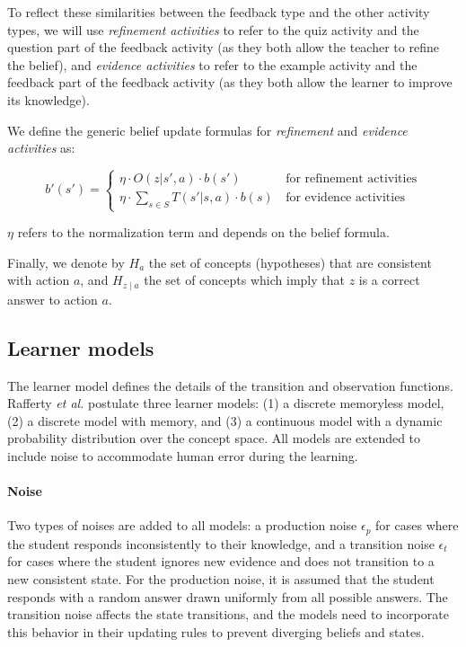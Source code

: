 \vspace{3mm}
To reflect these similarities between the feedback type and the other activity types, we will use \textit{refinement activities} to refer to the quiz activity and the question part of the feedback activity (as they both allow the teacher to refine the belief), and \textit{evidence activities} to refer to the example activity and the feedback part of the feedback activity (as they both allow the learner to improve its knowledge). 

We define the generic belief update formulas for \textit{refinement} and \textit{evidence activities} as:

\begin{equation}
    b'(s') = \begin{cases}
        \eta \cdot O(z|s',a) \cdot b(s')    & \, \text{for refinement activities} \\
        \eta \cdot \sum_{s \in S} T(s'|s, a) \cdot b(s)    & \, \text{for evidence activities}
    \end{cases}
    \label{eq:belief-update-types}
\end{equation}

$\eta$ refers to the normalization term and depends on the belief formula.

Finally, we denote by $H_a$ the set of concepts (hypotheses) that are consistent with action $a$, and $H_{z \mid a}$ the set of concepts which imply that $z$ is a correct answer to action $a$. 

\subsection{Learner models}

The learner model defines the details of the transition and observation functions.
Rafferty \textit{et al.} postulate three learner models: (1) a discrete memoryless model, (2) a discrete model with memory, and (3) a continuous model with a dynamic probability distribution over the concept space. All models are extended to include noise to accommodate human error during the learning.


\paragraph{Noise} Two types of noises are added to all models: a production noise $\epsilon_p$ for cases where the student responds inconsistently to their knowledge, and a transition noise $\epsilon_t$ for cases where the student ignores new evidence and does not transition to a new consistent state.
For the production noise, it is assumed that the student responds with a random answer drawn uniformly from all possible answers. 
The transition noise affects the state transitions, and the models need to incorporate this behavior in their updating rules to prevent diverging beliefs and states.

